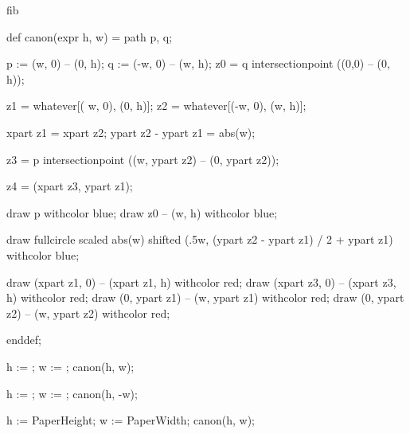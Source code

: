 

\startenvironment fib

	\setuppagenumbering[alternative=doublesided]

	\startMPdefinitions
		def canon(expr h, w) =
			path p, q;

			p := (w,  0) -- (0, h); %
			q := (-w, 0) -- (w, h); %
			z0 = q intersectionpoint ((0,0) -- (0, h)); %

			z1 = whatever[( w, 0), (0, h)]; %
			z2 = whatever[(-w, 0), (w, h)]; %

			xpart z1 = xpart z2;
			ypart z2 - ypart z1 = abs(w);

			z3 = p intersectionpoint ((w, ypart z2) -- (0, ypart z2)); %

			z4 = (xpart z3, ypart z1); %

			draw p withcolor blue;
			draw z0 -- (w, h) withcolor blue;

			draw fullcircle scaled abs(w) shifted (.5w, (ypart z2 - ypart z1) / 2 + ypart z1) withcolor blue;

			draw (xpart z1, 0) -- (xpart z1, h) withcolor red;
			draw (xpart z3, 0) -- (xpart z3, h) withcolor red;
			draw (0, ypart z1) -- (w, ypart z1) withcolor red;
			draw (0, ypart z2) -- (w, ypart z2) withcolor red;


		enddef;
	\stopMPdefinitions

		h := \overlayheight;
		w := \overlaywidth;
		canon(h, w);
	\stopreusableMPgraphic

		h := \overlayheight;
		w := \overlaywidth;
		canon(h, -w);
	\stopreusableMPgraphic

	\startmode[debug]

		\setupbackgrounds[leftpage] [background={canon-verso, footer-verso}]
		\setupbackgrounds[rightpage][background={canon-recto, footer-recto}]
	\stopmode

	\startMPcalculation
		h := PaperHeight;
		w := PaperWidth;
		canon(h, w);

